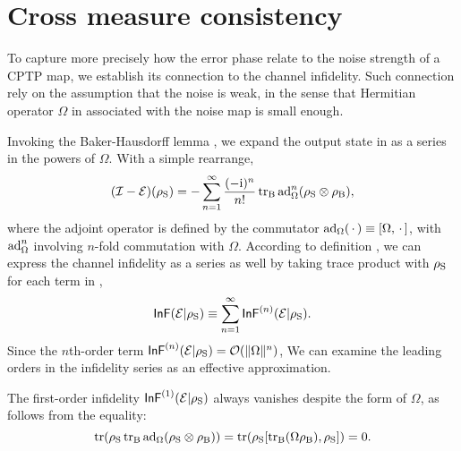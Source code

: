 \documentclass[pra,reprint,superscriptaddress]{revtex4-2}
\begin{document}
\section{Cross measure consistency}
To capture more precisely how the error phase relate to the noise strength of a CPTP map, we establish its connection to the channel infidelity.
Such connection rely on the assumption that the noise is weak, in the sense that Hermitian operator $\Omega$ in  associated with the noise map is small enough.

Invoking the Baker-Hausdorff lemma \cite{rossmann2006lie}, we expand the output state in  as a series in the powers of $\Omega$. With a simple rearrange,
\begin{equation}\label{eq:channel-series}
(\mathcal{I}-\mathcal{E})(\rho_\mathrm{S}) 
=-\sum_{n=1}^\infty \frac{(-\mathrm{i})^n}{n!} \operatorname{\operatorname{tr}_\mathrm{B}}\operatorname{ad}_{\Omega}^n(\rho_\mathrm{S}\otimes\rho_\mathrm{B}),
\end{equation}
where the adjoint operator is defined by the commutator $\operatorname{ad}_\Omega({\,\cdot\,})\equiv[\Omega,{\,\cdot\,}]$, with $\operatorname{ad}^n_\Omega$ involving $n$-fold commutation with $\Omega$. According to definition , we can express the channel infidelity as a series as well by taking trace product with $\rho_\mathrm{S}$ for each term in ,
\begin{equation}
\operatorname{\mathsf{InF}}(\mathcal{E}|\rho_{\mathrm{S}}) \equiv  \sum_{n=1}^\infty \operatorname{\mathsf{InF}}^{(n)}(\mathcal{E}|\rho_{\mathrm{S}}).
\end{equation}
Since the $n$th-order term $\operatorname{\mathsf{InF}}^{(n)}(\mathcal{E}|\rho_{\mathrm{S}}) =\mathcal{O}(\Vert {\Omega} \Vert^n)$,
We can examine the leading orders in the infidelity series as an effective approximation. 

The first-order infidelity  $\operatorname{\mathsf{InF}}^{(1)}(\mathcal{E}|\rho_{\mathrm{S}})$ always vanishes 
despite the form of $\Omega$, as follows from the equality:
\begin{equation}\label{eq:1st-infid}
\operatorname{tr}(\rho_\mathrm{S} \operatorname{\operatorname{tr}_\mathrm{B}} \operatorname{ad}_\Omega(\rho_{\mathrm{S}} \otimes\rho_{\mathrm{B}}))= \operatorname{tr}(\rho_\mathrm{S}[\operatorname{\operatorname{tr}_\mathrm{B}} (\Omega \rho_{\mathrm{B}}),\rho_{\mathrm{S}}])=0.
\end{equation}
\end{document}
